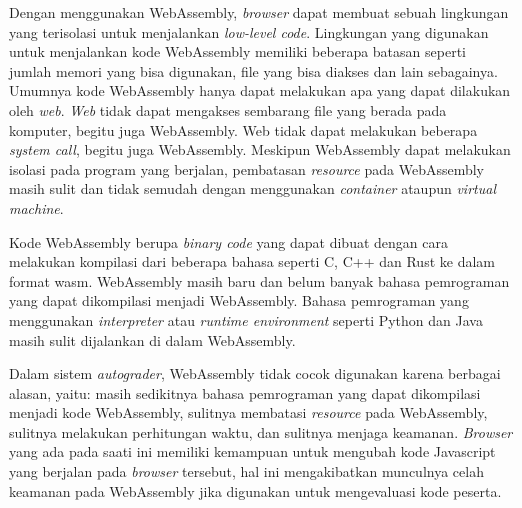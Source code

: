 \par Dengan menggunakan WebAssembly, \textit{browser} dapat membuat sebuah lingkungan yang terisolasi untuk menjalankan \textit{low-level code}. Lingkungan yang digunakan untuk menjalankan kode WebAssembly memiliki beberapa batasan seperti jumlah memori yang bisa digunakan, file yang bisa diakses dan lain sebagainya. Umumnya kode WebAssembly hanya dapat melakukan apa yang dapat dilakukan oleh \textit{web}. \textit{Web} tidak dapat mengakses sembarang file yang berada pada komputer, begitu juga WebAssembly. Web tidak dapat melakukan beberapa \textit{system call}, begitu juga WebAssembly. Meskipun WebAssembly dapat melakukan isolasi pada program yang berjalan, pembatasan \textit{resource} pada WebAssembly masih sulit dan tidak semudah dengan menggunakan \textit{container} ataupun \textit{virtual machine}. 

\par Kode WebAssembly berupa \textit{binary code} yang dapat dibuat dengan cara melakukan kompilasi dari beberapa bahasa seperti C, C++ dan Rust ke dalam format wasm. WebAssembly masih baru dan belum banyak bahasa pemrograman yang dapat dikompilasi menjadi WebAssembly. Bahasa pemrograman yang menggunakan \textit{interpreter} atau \textit{runtime environment} seperti Python dan Java masih sulit dijalankan di dalam WebAssembly.

\par Dalam sistem \textit{autograder}, WebAssembly tidak cocok digunakan karena berbagai alasan, yaitu: masih sedikitnya bahasa pemrograman yang dapat dikompilasi menjadi kode WebAssembly, sulitnya membatasi \textit{resource} pada WebAssembly, sulitnya melakukan perhitungan waktu, dan sulitnya menjaga keamanan. \textit{Browser} yang ada pada saati ini memiliki kemampuan untuk mengubah kode Javascript yang berjalan pada \textit{browser} tersebut, hal ini mengakibatkan munculnya celah keamanan pada WebAssembly jika digunakan untuk mengevaluasi kode peserta.

